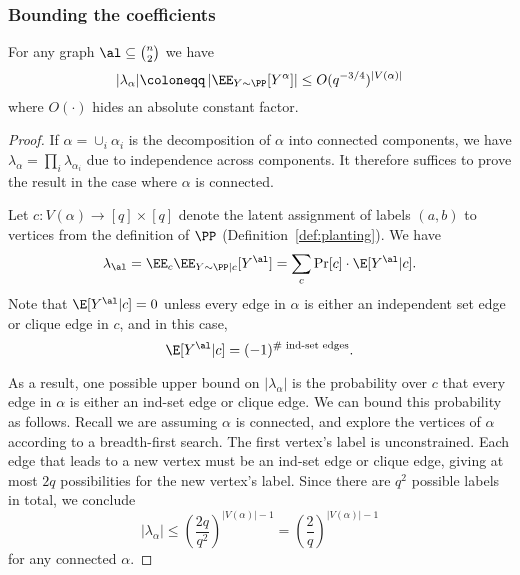 \documentclass{article}
\begin{document}
\subsubsection{Bounding the coefficients}

\begin{lemma}
\label{lem:lambda-bound}
For any graph $\al \subseteq \binom{n}{2}$ we have
\[ |\lambda_\alpha| \coloneqq \left|\EE_{Y \sim \PP}[Y^\alpha]\right| \le O(q^{-3/4})^{|V(\alpha)|} \]
where $O(\cdot)$ hides an absolute constant factor.
\end{lemma}

\begin{proof}
If $\alpha = \cup_i \alpha_i$ is the decomposition of $\alpha$ into connected components, we have $\lambda_\alpha = \prod_i \lambda_{\alpha_i}$ due to independence across components. It therefore suffices to prove the result in the case where $\alpha$ is connected.

Let $c: V(\alpha) \to [q] \times [q]$ denote the latent assignment of labels $(a,b)$ to vertices from the definition of $\PP$ (Definition~\ref{def:planting}). We have
\[ \lambda_\al = \EE_c \EE_{Y \sim \PP|c}[Y^{\al}] =
\sum_c \Pr[c] \cdot \E[Y^\al|c]. \]
Note that $\E[Y^\al|c] = 0$ unless every edge in $\alpha$ is either an independent set edge or clique edge in $c$, and in this case,
\[ \E[Y^\al|c] = (-1)^{\#\text{ ind-set edges}}. \]

As a result, one possible upper bound on $|\lambda_\alpha|$ is the probability over $c$ that every edge in $\alpha$ is either an ind-set edge or clique edge. We can bound this probability as follows. Recall we are assuming $\alpha$ is connected, and explore the vertices of $\alpha$ according to a breadth-first search. The first vertex's label is unconstrained. Each edge that leads to a new vertex must be an ind-set edge or clique edge, giving at most $2q$ possibilities for the new vertex's label. Since there are $q^2$ possible labels in total, we conclude
\begin{equation}\label{eq:generic-lambda}
|\lambda_\alpha| \le \left(\frac{2q}{q^2}\right)^{|V(\alpha)|-1} = \left(\frac{2}{q}\right)^{|V(\alpha)|-1}
\end{equation}
for any connected $\alpha$.


\end{proof}
\end{document}
